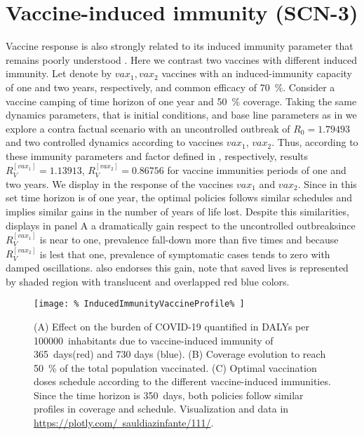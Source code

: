 \section*{Vaccine-induced immunity (SCN-3)}
    Vaccine response is also strongly related to its induced immunity
    \textemdash parameter that remains poorly understood
    \cite{Jeyanathan2020}.
    Here we contrast two vaccines with different induced immunity. Let
    denote by $vax_1, vax_2$ vaccines with an induced-immunity capacity of one and
    two years, respectively, and common efficacy of \SI{70}{\percent}. Consider a
    vaccine camping of time horizon of one year and \SI{50}{\percent} coverage.
    Taking the same dynamics parameters, that is initial conditions, and base
    line parameters as in   we explore a
    contra factual scenario with an uncontrolled outbreak of
    $R_0 = \num{1.79493}$ and two controlled dynamics according to vaccines
    $vax_1$, $vax_2$. Thus, according to these immunity parameters and factor
    defined in  ,
    respectively, results
    $R_V^{[vax_1]} = \num{1.13913}$, $R_V^{[vax_2]} = \num{0.86756}$
    for vaccine immunities periods of one and two years. We display in
     the response of the
    vaccines $vax_1$ and $vax_2$. Since in this set time
    horizon is of one year, the optimal policies follows similar schedules and
    implies similar gains in the number of years of life lost. Despite this
    similarities, 
    displays in panel A a dramatically gain respect to the
    uncontrolled outbreak\textemdash since
    $R_V ^{[vax_1]}$ is near to one, prevalence fall-down more than five times
    and because $R_V ^{[vax_2]}$ is lest that one, prevalence of symptomatic
    cases tends to zero with damped oscillations.
     also endorses this gain,
    note that saved lives is represented by  shaded region with translucent
    and overlapped red blue colors.
%
    \begin{figure*}[htb]
        \centering
        \texttt{[image: \%
        InducedImmunityVaccineProfile\%
        ]}
        \caption[
            Effect of Vaccine-induced immunity effect on the burden of COVID-19.
        ]{
            (A) Effect on the burden of COVID-19 quantified in DALYs per
            \SI{100000}{inhabitants} due to vaccine-induced immunity of
            \SI{365}{days}(red) and 730 days (blue).
            (B) Coverage evolution to reach \SI{50}{\percent} of the total
            population vaccinated.
            (C) Optimal vaccination doses schedule according to the different
            vaccine-induced immunities. Since the time horizon is
            \SI{350}{days}, both policies follow similar profiles in coverage
            and schedule. Visualization and data in
            \href{https://plotly.com/~sauldiazinfante/111/}{%
                https://plotly.com/~sauldiazinfante/111/}.
        }
        \label{fig:induced_immunity_vaccine_profile}
    \end{figure*}
